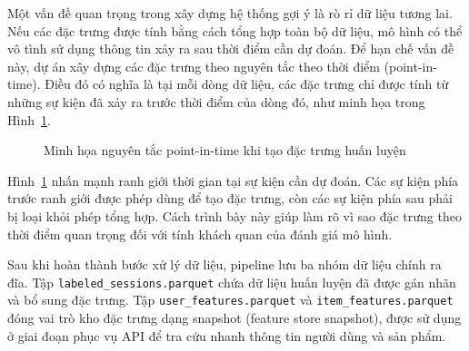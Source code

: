 Một vấn đề quan trọng trong xây dựng hệ thống gợi ý là rò rỉ dữ liệu tương lai. Nếu các đặc trưng được tính bằng cách tổng hợp toàn bộ dữ liệu, mô hình có thể vô tình sử dụng thông tin xảy ra sau thời điểm cần dự đoán. Để hạn chế vấn đề này, dự án xây dựng các đặc trưng theo nguyên tắc theo thời điểm (point-in-time). Điều đó có nghĩa là tại mỗi dòng dữ liệu, các đặc trưng chỉ được tính từ những sự kiện đã xảy ra trước thời điểm của dòng đó, như minh họa trong Hình~\ref{fig:point_in_time_features}.

\begin{figure}[H]
\centering
{}
\caption{Minh họa nguyên tắc point-in-time khi tạo đặc trưng huấn luyện}
\label{fig:point_in_time_features}
\end{figure}

Hình~\ref{fig:point_in_time_features} nhấn mạnh ranh giới thời gian tại sự kiện cần dự đoán. Các sự kiện phía trước ranh giới được phép dùng để tạo đặc trưng, còn các sự kiện phía sau phải bị loại khỏi phép tổng hợp. Cách trình bày này giúp làm rõ vì sao đặc trưng theo thời điểm quan trọng đối với tính khách quan của đánh giá mô hình.
\medskip

Sau khi hoàn thành bước xử lý dữ liệu, pipeline lưu ba nhóm dữ liệu chính ra đĩa. Tập \texttt{labeled\_sessions.parquet} chứa dữ liệu huấn luyện đã được gán nhãn và bổ sung đặc trưng. Tập \texttt{user\_features.parquet} và \texttt{item\_features.parquet} đóng vai trò kho đặc trưng dạng snapshot (feature store snapshot), được sử dụng ở giai đoạn phục vụ API để tra cứu nhanh thông tin người dùng và sản phẩm.

